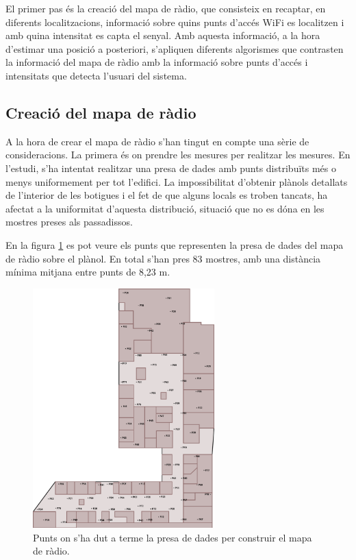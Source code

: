 El primer pas és la creació del mapa de ràdio, que consisteix en recaptar, en diferents localitzacions, informació sobre quins punts d'accés WiFi es localitzen i amb quina intensitat es capta el senyal. Amb aquesta informació, a la hora d'estimar una posició a posteriori, s'apliquen diferents algorismes que contrasten la informació del mapa de ràdio amb la informació sobre punts d'accés i intensitats que detecta l'usuari del sistema.

\subsection{Creació del mapa de ràdio}

A la hora de crear el mapa de ràdio s'han tingut en compte una sèrie de consideracions. La primera és on prendre les mesures per realitzar les mesures. En l'estudi, s'ha intentat realitzar una presa de dades amb punts distribuïts més o menys uniformement per tot l'edifici. La impossibilitat d'obtenir plànols detallats de l'interior de les botigues i el fet de que alguns locals es troben tancats, ha afectat a la uniformitat d'aquesta distribució, situació que no es dóna en les mostres preses als passadissos.

En la figura \ref{fig:planol_log} es pot veure els punts que representen la presa de dades del mapa de ràdio sobre el plànol. En total s'han pres 83 mostres, amb una distància mínima mitjana entre punts de 8,23 m.

\begin{figure}[ht]
\begin{center}
\includegraphics[width=7cm]{imatges/planol_log.png}
\caption{Punts on s'ha dut a terme la presa de dades per construir el mapa de ràdio.}
\label{fig:planol_log}
\end{center}
\end{figure}


